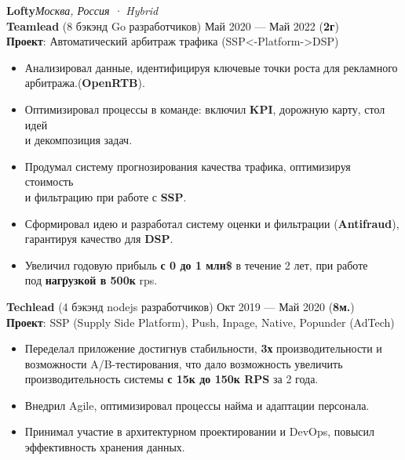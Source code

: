 \documentclass{resume}
\begin{document}
\begin{rSection}
    \textbf{Lofty}\hfill \textit{Москва, Россия · Hybrid} \\
    \textbf{Teamlead} (8 бэкэнд Go разработчиков) \hfill Май 2020 --- Май 2022 ({\textbf{2г}}) \\
    \textbf{Проект}: Автоматический арбитраж трафика (SSP<-Platform->DSP)
    \begin{itemize}
        \item Анализировал данные, идентифицируя ключевые точки роста для рекламного арбитража.(\textbf{OpenRTB})\@.
        \item Оптимизировал процессы в команде: включил \textbf{KPI}, дорожную карту, стол идей \\ и декомпозиция задач\@.
        \item Продумал систему прогнозирования качества трафика, оптимизируя стоимость \\ и фильтрацию при работе с \textbf{SSP}\@.
        \item Сформировал идею и разработал систему оценки и фильтрации (\textbf{Antifraud}), гарантируя качество для \textbf{DSP}\@.
        \item Увеличил годовую прибыль \textbf{с 0 до 1 млн\$} в течение 2 лет, при работе \\ под \textbf{нагрузкой в 500к} rps\@.
    \end{itemize}
    \textbf{Techlead} (4 бэкэнд nodejs разработчиков) \hfill Окт 2019 --- Май 2020 ({\textbf{8м.}}) \\
    \textbf{Проект}: SSP (Supply Side Platform), Push, Inpage, Native, Popunder (AdTech)
    \begin{itemize}
        \item Переделал приложение достигнув стабильности, \textbf{3х} производительности и возможности A/B-тестирования,
        что дало возможность увеличить производительность системы \textbf{с 15к до 150к RPS} за 2 года\@.
        \item Внедрил Agile, оптимизировал процессы найма и адаптации персонала\@.
        \item Принимал участие в архитектурном проектировании и DevOps, повысил эффективность хранения данных\@.
    \end{itemize}


\end{rSection}
\end{document}
